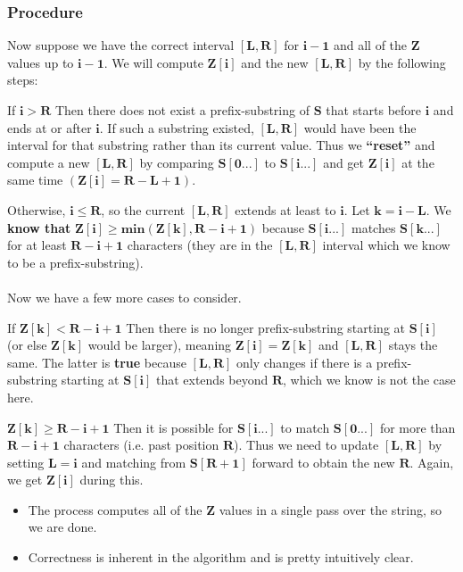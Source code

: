 \documentclass{beamer}
\begin{document}
\begin{frame}
\frametitle{Procedure}
 Now suppose we have the correct interval $\mathbf{[L, R]}$ for $\mathbf{i-1}$ and all of the $\mathbf{Z}$ values up to $\mathbf{i-1}$. We will compute $\mathbf{Z[i]}$ and the new $\mathbf{[L, R]}$ by the following steps:
\begin{block}{If $\mathbf{i > R}$}
Then there does not exist a prefix-substring of $\mathbf{S}$ that starts before $\mathbf{i}$ and ends at or after $\mathbf{i}$. If such a substring existed, $\mathbf{[L, R]}$ would have been the interval for that substring rather than its current value. Thus we \textbf{``reset''} and compute a new $\mathbf{[L, R]}$ by comparing $\mathbf{S[0...]}$ to $\mathbf{S[i...]}$ and get $\mathbf{Z[i]}$ at the same time $(\mathbf{Z[i] = R - L + 1})$.
\end{block}

\end{frame}
\begin{frame}
Otherwise, $\mathbf{i \le R}$, so the current $\mathbf{[L, R]}$ extends at least to $\mathbf{i}$. Let $\mathbf{k = i - L}$. We \textbf{know that} $\mathbf{Z[i] \ge min(Z[k], R - i + 1)}$ because $\mathbf{S[i...]}$ matches $\mathbf{S[k...]}$ for at least $\mathbf{R - i + 1}$ characters (they are in the $\mathbf{[L, R]}$ interval which we know to be a prefix-substring).\\~\\

Now we have a few more cases to consider.
\begin{block}{If $\mathbf{Z[k] < R - i + 1}$}
Then there is no longer prefix-substring starting at $\mathbf{S[i]}$ (or else $\mathbf{Z[k]}$ would be larger), meaning $\mathbf{Z[i] = Z[k]}$ and $\mathbf{[L, R]}$ stays the same. The latter is \textbf{true} because $\mathbf{[L, R]}$ only changes if there is a prefix-substring starting at $\mathbf{S[i]}$ that extends beyond $\mathbf{R}$, which we know is not the case here.
\end{block}
\end{frame}
\begin{frame}

\begin{block}{$\mathbf{Z[k] \ge R - i + 1}$}
Then it is possible for $\mathbf{S[i...]}$ to match $\mathbf{S[0...]}$ for more than $\mathbf{R - i + 1}$ characters (i.e. past position $\mathbf{R}$). Thus we need to update $\mathbf{[L, R]}$ by setting $\mathbf{L = i}$ and matching from $\mathbf{S[R + 1]}$ forward to obtain the new $\mathbf{R}$. Again, we get $\mathbf{Z[i]}$ during this.
\end{block}

\begin{itemize}
\item The process computes all of the $\mathbf{Z}$ values in a single pass over the string, so we are done.
\item Correctness is inherent in the algorithm and is pretty intuitively clear.
\end{itemize}
\end{frame}
\end{document}
